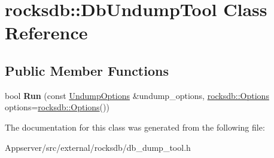 \hypertarget{classrocksdb_1_1DbUndumpTool}{}\section{rocksdb\+:\+:Db\+Undump\+Tool Class Reference}
\label{classrocksdb_1_1DbUndumpTool}
\subsection*{Public Member Functions}
\begin{DoxyCompactItemize}
\item 
bool {\bfseries Run} (const \hyperlink{structrocksdb_1_1UndumpOptions}{Undump\+Options} \&undump\+\_\+options, \hyperlink{structrocksdb_1_1Options}{rocksdb\+::\+Options} options=\hyperlink{structrocksdb_1_1Options}{rocksdb\+::\+Options}())\hypertarget{classrocksdb_1_1DbUndumpTool_a1572278b116102bbb139c3da6dc3e3b2}{}\label{classrocksdb_1_1DbUndumpTool_a1572278b116102bbb139c3da6dc3e3b2}

\end{DoxyCompactItemize}


The documentation for this class was generated from the following file\+:\begin{DoxyCompactItemize}
\item 
Appserver/src/external/rocksdb/db\+\_\+dump\+\_\+tool.\+h\end{DoxyCompactItemize}
